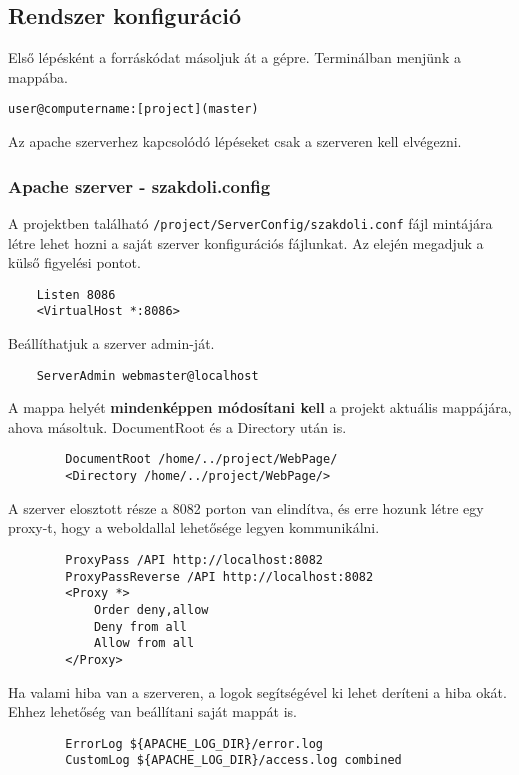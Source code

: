 \subsection{Rendszer konfiguráció}
Első lépésként a forráskódat másoljuk át a gépre.
Terminálban menjünk a mappába.
\begin{verbatim}
user@computername:[project](master)
\end{verbatim}

Az apache szerverhez kapcsolódó lépéseket csak a szerveren kell elvégezni.
\subsubsection{Apache szerver - szakdoli.config}
	A projektben található \texttt{/project/ServerConfig/szakdoli.conf} fájl mintájára létre lehet hozni a saját szerver konfigurációs fájlunkat.
	\newline
	Az elején megadjuk a külső figyelési pontot.
	\begin{verbatim}
	Listen 8086
	<VirtualHost *:8086>
	\end{verbatim}

	Beállíthatjuk a szerver admin-ját.
	
	\begin{verbatim}
	ServerAdmin webmaster@localhost
	\end{verbatim}

	A mappa helyét \textbf{mindenképpen módosítani kell} a projekt aktuális mappájára, ahova másoltuk.
	DocumentRoot és a Directory után is.
	
	\begin{verbatim}
		DocumentRoot /home/../project/WebPage/
		<Directory /home/../project/WebPage/>
	\end{verbatim}
	
	A szerver elosztott része a 8082 porton van elindítva, és erre hozunk létre egy proxy-t, hogy a weboldallal lehetősége legyen kommunikálni.
	
	\begin{verbatim}
		ProxyPass /API http://localhost:8082
		ProxyPassReverse /API http://localhost:8082
		<Proxy *>
		    Order deny,allow
		    Deny from all
		    Allow from all
		</Proxy> 
	\end{verbatim}
	
	Ha valami hiba van a szerveren, a logok segítségével ki lehet deríteni a hiba okát. Ehhez lehetőség van beállítani saját mappát is.

	\begin{verbatim}
		ErrorLog ${APACHE_LOG_DIR}/error.log
		CustomLog ${APACHE_LOG_DIR}/access.log combined
	\end{verbatim}

